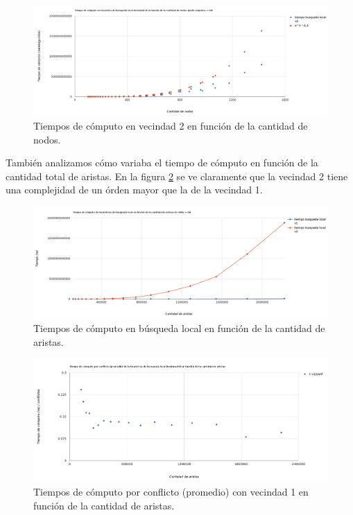  \begin{figure}[H]
	\centering
 	\includegraphics[width=18cm]{imagenes/Ej4/TvsNodosV2.png}
	\caption{Tiempos de cómputo en vecindad 2 en función de la cantidad de nodos.}
	\label{nodosEj4-v2}
 \end{figure}
 
También analizamos cómo variaba el tiempo de cómputo en función de la cantidad total de aristas. En la figura \ref{aristasEj4-Comp} se ve claramente que la vecindad 2 tiene una complejidad de un órden mayor que la de la vecindad 1.




\begin{figure}[H]
	\centering
 	\includegraphics[width=18cm]{imagenes/Ej4/TvsAristasComp.png}
	\caption{Tiempos de cómputo en búsqueda local en función de la cantidad de aristas.}
	\label{aristasEj4-Comp}
 \end{figure}

\begin{figure}[H]
	\centering
 	\includegraphics[width=18cm]{imagenes/Ej4/tiempoPorConflictovsAristasV1.png}
	\caption{Tiempos de cómputo por conflicto (promedio) con vecindad 1 en función de la cantidad de aristas.}
	\label{aristasEj4-V1}
 \end{figure}
 
